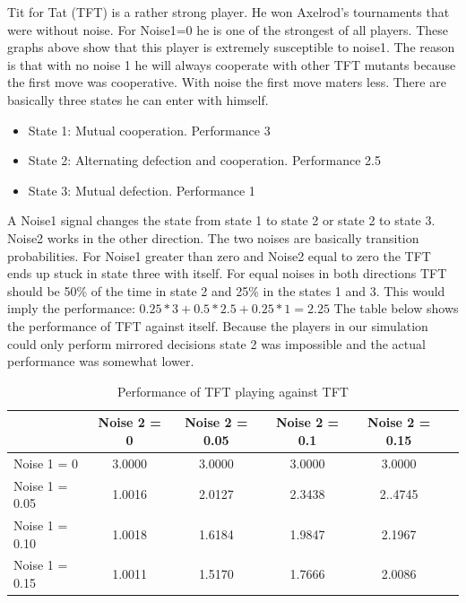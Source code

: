 \documentclass[11pt,twoside]{article}
\begin{document}
Tit for Tat (TFT) is a rather strong player. He won Axelrod's tournaments that were without noise. For Noise1=0 he is one of the strongest of all players. These graphs above show that this player is extremely susceptible to noise1. The reason is that with no noise 1 he will always cooperate with other TFT mutants because the first move was cooperative. With noise the first move maters less. There are basically three states he can enter with himself.

\renewcommand{\labelitemi}{}

\begin{itemize}
	\item State 1: Mutual cooperation. Performance 3
	\item State 2: Alternating defection and cooperation. Performance 2.5
	\item State 3: Mutual defection. Performance 1
\end{itemize}

 A Noise1 signal changes the state from state 1 to state 2 or state 2 to state 3. Noise2 works in the other direction. The two noises are basically transition probabilities. For Noise1 greater than zero and Noise2 equal to zero the TFT ends up stuck in state three with itself. For equal noises in both directions TFT should be 50\% of the time in state 2 and 25\% in the states 1 and 3. This would imply the performance: 
$0.25*3+0.5*2.5+0.25*1=2.25$
The table below shows the performance of TFT against itself. Because the players in our simulation could only perform mirrored decisions state 2 was impossible and the actual performance was somewhat lower.

\begin{table}[h]
 \begin{center}
\caption{Performance of TFT playing against TFT} \vspace{3mm}
\begin{tabular}{|l|c|c|c|c|c|}
\hline
   	& Noise 2 = 0 & Noise 2 = 0.05& Noise 2 = 0.1& Noise 2 = 0.15 \\
  \hline
  Noise 1 = 0 	& 3.0000	 &3.0000 	&3.0000	&3.0000 \\
 \hline
  Noise 1 = 0.05	 & 1.0016	 &2.0127 	&2.3438	&2..4745 \\
 \hline
  Noise 1 = 0.10 	& 1.0018	 &1.6184 	&1.9847	&2.1967 \\
 \hline
  Noise 1 = 0.15 	& 1.0011	 &1.5170 	&1.7666	&2.0086 \\
 \hline
\end{tabular}
 \end{center}
\end{table}
\end{document}
